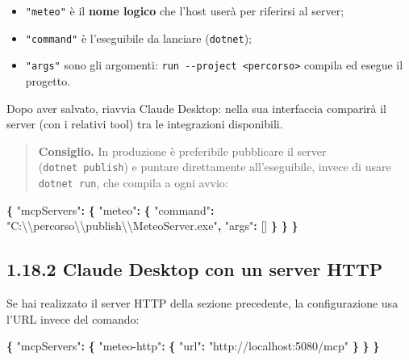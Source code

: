 \documentclass[
  italian,
  10pt,
]{book}
\newenvironment{Shaded}{\begin{snugshade}}{\end{snugshade}}
\newcommand{\CharTok}[1]{\textcolor[rgb]{0.31,0.60,0.02}{#1}}
\newcommand{\DataTypeTok}[1]{\textcolor[rgb]{0.13,0.29,0.53}{#1}}
\newcommand{\FunctionTok}[1]{\textcolor[rgb]{0.13,0.29,0.53}{\textbf{#1}}}
\newcommand{\OtherTok}[1]{\textcolor[rgb]{0.56,0.35,0.01}{#1}}
\newcommand{\StringTok}[1]{\textcolor[rgb]{0.31,0.60,0.02}{#1}}
\providecommand{\tightlist}{%
  \setlength{\itemsep}{0pt}\setlength{\parskip}{0pt}}
\begin{document}
\begin{itemize}
\tightlist
\item
  \texttt{"meteo"} è il \textbf{nome logico} che l'host userà per
  riferirsi al server;
\item
  \texttt{"command"} è l'eseguibile da lanciare (\texttt{dotnet});
\item
  \texttt{"args"} sono gli argomenti:
  \texttt{run\ -\/-project\ \textless{}percorso\textgreater{}} compila
  ed esegue il progetto.
\end{itemize}

Dopo aver salvato, riavvia Claude Desktop: nella sua interfaccia
comparirà il server (con i relativi tool) tra le integrazioni
disponibili.

\begin{quote}
\textbf{Consiglio.} In produzione è preferibile pubblicare il server
(\texttt{dotnet\ publish}) e puntare direttamente all'eseguibile, invece
di usare \texttt{dotnet\ run}, che compila a ogni avvio:
\end{quote}

\begin{Shaded}
\begin{Highlighting}[]
\FunctionTok{\{}
  \DataTypeTok{"mcpServers"}\FunctionTok{:} \FunctionTok{\{}
    \DataTypeTok{"meteo"}\FunctionTok{:} \FunctionTok{\{}
      \DataTypeTok{"command"}\FunctionTok{:} \StringTok{"C:}\CharTok{\textbackslash{}\textbackslash{}}\StringTok{percorso}\CharTok{\textbackslash{}\textbackslash{}}\StringTok{publish}\CharTok{\textbackslash{}\textbackslash{}}\StringTok{MeteoServer.exe"}\FunctionTok{,}
      \DataTypeTok{"args"}\FunctionTok{:} \OtherTok{[]}
    \FunctionTok{\}}
  \FunctionTok{\}}
\FunctionTok{\}}
\end{Highlighting}
\end{Shaded}

\subsection{1.18.2 Claude Desktop con un server
HTTP}\label{claude-desktop-con-un-server-http}

Se hai realizzato il server HTTP della sezione precedente, la
configurazione usa l'URL invece del comando:

\begin{Shaded}
\begin{Highlighting}[]
\FunctionTok{\{}
  \DataTypeTok{"mcpServers"}\FunctionTok{:} \FunctionTok{\{}
    \DataTypeTok{"meteo{-}http"}\FunctionTok{:} \FunctionTok{\{}
      \DataTypeTok{"url"}\FunctionTok{:} \StringTok{"http://localhost:5080/mcp"}
    \FunctionTok{\}}
  \FunctionTok{\}}
\FunctionTok{\}}
\end{Highlighting}
\end{Shaded}
\end{document}
